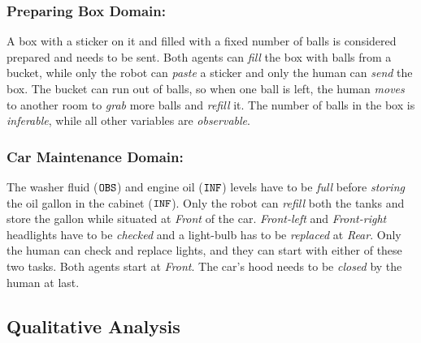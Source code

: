 \documentclass[letterpaper]{article} %
\begin{document}
\subsubsection{Preparing Box Domain:}
A box with a sticker on it and filled with a fixed number of balls is considered prepared and needs to be sent. Both agents can \textit{fill} the box with balls from a bucket, while only the robot can \textit{paste} a sticker and only the human can \textit{send} the box. The bucket can run out of balls, so when one ball is left, the human \textit{moves} to another room to \textit{grab} more balls and \textit{refill} it. 
The number of balls in the box is \textit{inferable}, while all other variables are {\em observable}. 

\subsubsection{Car Maintenance Domain:}
The washer fluid ($\texttt{OBS}$) and engine oil ($\texttt{INF}$) levels have to be \textit{full} before \textit{storing} the oil gallon in the cabinet ($\texttt{INF}$). 
Only the robot can \textit{refill} both the tanks and store the gallon while situated at \textit{Front} of the car. 
\textit{Front-left} and \textit{Front-right} headlights have to be \textit{checked} and a light-bulb has to be \textit{replaced} at \textit{Rear}. 
Only the human can check and replace lights, and they can start with either of these two tasks.
Both agents start at \textit{Front}.
The car's hood needs to be \textit{closed} by the human at last.

\subsection{Qualitative Analysis}
\end{document}
